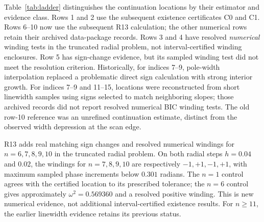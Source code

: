 \documentclass[a4paper,11pt]{article}
\begin{document}
Table~\ref{tab:ladder} distinguishes the continuation locations by their
estimator and evidence class. Rows 1 and 2 use the subsequent existence
certificates C0 and C1. Rows 6--10 now use the subsequent R13 calculation;
the other numerical rows retain their archived data-package records.
Rows 3 and 4 have resolved \emph{numerical} winding
tests in the truncated radial problem, not interval-certified winding
enclosures. Row 5 has sign-change evidence, but its sampled winding test
did not meet the resolution criterion. Historically, for indices 7--9, pole-width
interpolation replaced a problematic direct sign calculation with strong
interior growth. For indices 7--9 and 11--15, locations were reconstructed
from short linewidth samples using signs selected to match neighboring
slopes; those archived records did not report resolved numerical BIC
winding tests. The old row-10 reference was an unrefined continuation
estimate, distinct from the observed width depression at the scan edge.

R13 adds real matching sign changes and resolved numerical windings for
$n=6,7,8,9,10$ in the truncated radial problem. On both radial steps
$h=0.04$ and $0.02$, the windings for $n=7,8,9,10$ are respectively
$-1,+1,-1,+1$, with maximum sampled phase increments below $0.301$
radians. The $n=1$ control agrees with the certified location to its
prescribed tolerance; the $n=6$ control gives approximately
$\omega^2=0.569360$ and a resolved positive winding. This is new
numerical evidence, not additional interval-certified existence results.
For $n\geq11$, the earlier linewidth evidence retains its previous status.
\end{document}
